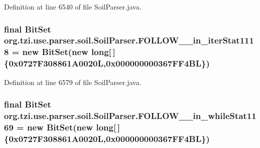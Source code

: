 Definition at line 6540 of file Soil\-Parser.\-java.

\hypertarget{classorg_1_1tzi_1_1use_1_1parser_1_1soil_1_1_soil_parser_a4d31cad40747d3fa0a47d5e59b7bcecb}{
\subsubsection[{F\-O\-L\-L\-O\-W\-\_\-60\-\_\-in\-\_\-iter\-Stat1118}]{\setlength{\rightskip}{0pt plus 5cm}final Bit\-Set org.\-tzi.\-use.\-parser.\-soil.\-Soil\-Parser.\-F\-O\-L\-L\-O\-W\-\_\-\_\-in\-\_\-iter\-Stat1118 = new Bit\-Set(new long\mbox{[}$\,$\mbox{]}\{0x0727\-F308861\-A0020\-L,0x000000000367\-F\-F4\-B\-L\})\hspace{0.3cm}{\ttfamily [static]}}}\label{classorg_1_1tzi_1_1use_1_1parser_1_1soil_1_1_soil_parser_a4d31cad40747d3fa0a47d5e59b7bcecb}


Definition at line 6579 of file Soil\-Parser.\-java.

\hypertarget{classorg_1_1tzi_1_1use_1_1parser_1_1soil_1_1_soil_parser_a1616dfefba11d4ee271712b9d2a73824}{
\subsubsection[{F\-O\-L\-L\-O\-W\-\_\-60\-\_\-in\-\_\-while\-Stat1169}]{\setlength{\rightskip}{0pt plus 5cm}final Bit\-Set org.\-tzi.\-use.\-parser.\-soil.\-Soil\-Parser.\-F\-O\-L\-L\-O\-W\-\_\-\_\-in\-\_\-while\-Stat1169 = new Bit\-Set(new long\mbox{[}$\,$\mbox{]}\{0x0727\-F308861\-A0020\-L,0x000000000367\-F\-F4\-B\-L\})\hspace{0.3cm}{\ttfamily [static]}}}\label{classorg_1_1tzi_1_1use_1_1parser_1_1soil_1_1_soil_parser_a1616dfefba11d4ee271712b9d2a73824}


